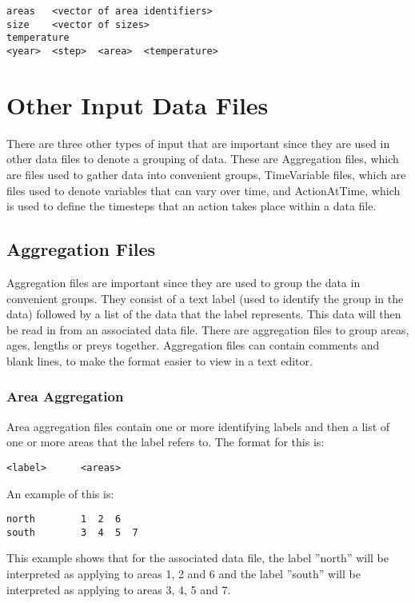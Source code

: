 \documentclass[10pt,twoside]{book}
\begin{document}
{\small\begin{verbatim}
areas   <vector of area identifiers>
size    <vector of sizes>
temperature
<year>  <step>  <area>  <temperature>
\end{verbatim}}

\section{Other Input Data Files}\label{sec:otherinputfile}
There are three other types of input that are important since they are used in other data files to denote a grouping of data.  These are Aggregation files, which are files used to gather data into convenient groups, TimeVariable files, which are files used to denote variables that can vary over time, and ActionAtTime, which is used to define the timesteps that an action takes place within a data file.

\subsection{Aggregation Files}
Aggregation files are important since they are used to group the data in convenient groups.  They consist of a text label (used to identify the group in the data) followed by a list of the data that the label represents.  This data will then be read in from an associated data file.  There are aggregation files to group areas, ages, lengths or preys together.  Aggregation files can contain comments and blank lines, to make the format easier to view in a text editor.

\subsubsection{Area Aggregation}
Area aggregation files contain one or more identifying labels and then a list of one or more areas that the label refers to.  The format for this is:

{\small\begin{verbatim}
<label>      <areas>
\end{verbatim}}

An example of this is:

{\small\begin{verbatim}
north        1  2  6
south        3  4  5  7
\end{verbatim}}

This example shows that for the associated data file, the label ''north'' will be interpreted as applying to areas 1, 2 and 6 and the label ''south'' will be interpreted as applying to areas 3, 4, 5 and 7.
\end{document}
